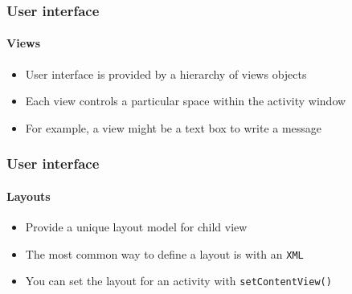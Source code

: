 %
%

\begin{frame}
  \frametitle{User interface}
  \framesubtitle{Views}


  \begin{itemize}
  \item<1-> User interface is provided by a hierarchy of views objects
  \item<2-> Each view controls a particular space within the activity
    window
  \item<3-> For example, a view might be a text box to write a message
  \end{itemize}

\end{frame}

\begin{frame}
  \frametitle{User interface}
  \framesubtitle{Layouts}


  \begin{itemize}
  \item<1-> Provide a unique layout model for child view
  \item<2-> The most common way to define a layout is with an \texttt{XML}
  \item<3-> You can set the layout for an activity with
    \lstinline{setContentView()}
  \end{itemize}

\end{frame}


